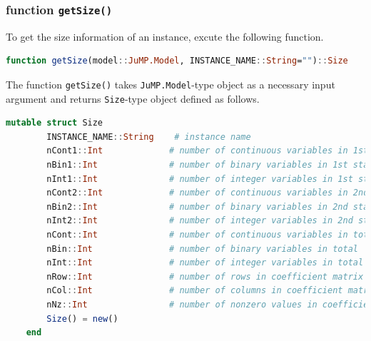 \documentclass{hitec}
\newcommand{\jumpmodel}{\texttt{JuMP.Model}}
\begin{document}
	\subsubsection{function \texttt{getSize()}}
	To get the size information of an instance, excute the following function.
	\begin{lstlisting}[frame=single,language=julia]
	function getSize(model::JuMP.Model, INSTANCE_NAME::String="")::Size
	\end{lstlisting}
	The function \texttt{getSize()} takes \jumpmodel-type object as a necessary input argument and returns \texttt{Size}-type object defined as follows.
	\begin{lstlisting}[frame=single,language=julia]
	mutable struct Size
		INSTANCE_NAME::String    # instance name
		nCont1::Int             # number of continuous variables in 1st stage
		nBin1::Int              # number of binary variables in 1st stage
		nInt1::Int              # number of integer variables in 1st stage
		nCont2::Int             # number of continuous variables in 2nd stage    
		nBin2::Int              # number of binary variables in 2nd stage
		nInt2::Int              # number of integer variables in 2nd stage    
		nCont::Int              # number of continuous variables in total      
		nBin::Int               # number of binary variables in total      
		nInt::Int               # number of integer variables in total      
		nRow::Int               # number of rows in coefficient matrix in extensive form
		nCol::Int               # number of columns in coefficient matrix in extensive form
		nNz::Int                # number of nonzero values in coefficient matrix in extensive form
		Size() = new()
	end
	\end{lstlisting}
	
\end{document}
